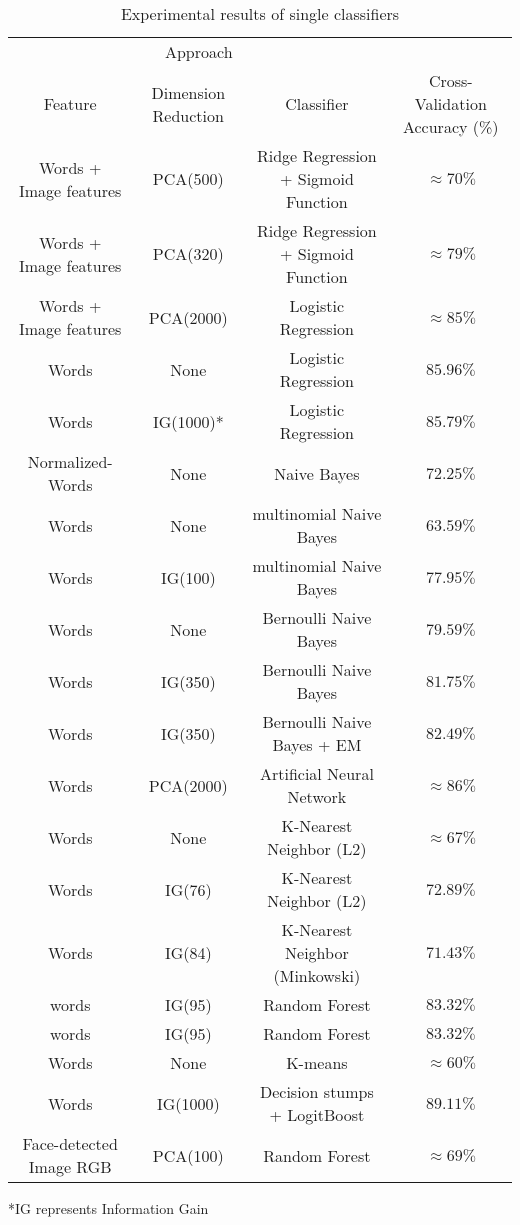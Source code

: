 \begin{table}[h!]
\centering
\begin{tabular}{ c c c c}
\hline
\multicolumn{3}{c}{Approach} \\
\cline{1-3}
Feature & Dimension Reduction & Classifier & Cross-Validation Accuracy (\%) \\
\hline
Words + Image features & PCA(500) & Ridge Regression + Sigmoid Function & $\approx 70\%$\\
Words + Image features & PCA(320) & Ridge Regression + Sigmoid Function & $\approx 79\%$ \\
Words + Image features & PCA(2000) & Logistic Regression & $\approx 85\%$ \\
Words & None & Logistic Regression & $ 85.96\%$ \\
Words & IG(1000)* & Logistic Regression & $ 85.79\%$ \\
Normalized-Words & None & Naive Bayes & $72.25\%$ \\
Words & None & multinomial Naive Bayes & $ 63.59\%$ \\
Words & IG(100) & multinomial Naive Bayes & $ 77.95\%$ \\
Words & None & Bernoulli Naive Bayes & $ 79.59\%$ \\
Words & IG(350) & Bernoulli Naive Bayes & $ 81.75\%$ \\
Words & IG(350) & Bernoulli Naive Bayes + EM & $ 82.49\%$ \\
Words & PCA(2000) & Artificial Neural Network & $ \approx 86\%$ \\
Words & None & K-Nearest Neighbor (L2) & $ \approx 67\%$ \\
Words & IG(76) & K-Nearest Neighbor (L2) & $ 72.89\%$ \\
Words & IG(84) & K-Nearest Neighbor (Minkowski)  & $ 71.43\%$ \\
words & IG(95) & Random Forest & $83.32\%$ \\
words & IG(95) & Random Forest & $83.32\%$ \\
Words & None & K-means & $ \approx 60\%$\\
Words & IG(1000) & Decision stumps + LogitBoost& $89.11\%$\\
Face-detected Image RGB & PCA(100) & Random Forest & $\approx 69\%$ \\
\end{tabular}
\caption{Experimental results of single classifiers}
\label{Table 1}
\end{table}

*IG represents Information Gain

